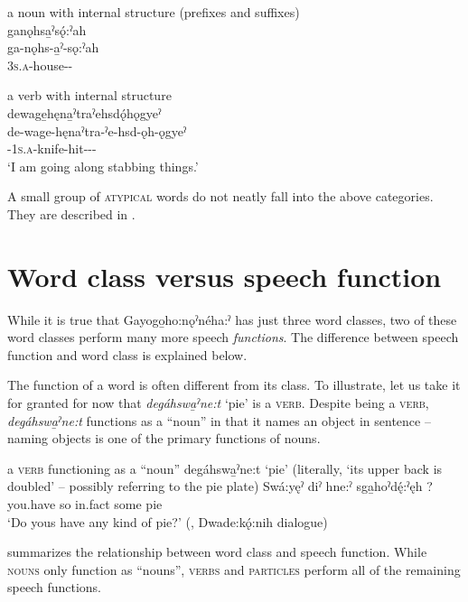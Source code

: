 \ea\label{ex:nstr} a noun with internal structure (prefixes and suffixes)\\
ganǫhsa̱ˀsǫ́:ˀah\\
\gll ga-nǫhs-a̱ˀ-sǫ:ˀah\\
 \textsc{3s.a}-house-{\nounstemformer}-{\pluralizer}\\
\glt {}
\z


\ea\label{ex:vstr} a verb with internal structure\\
dewage̱hęna̱ˀtraˀehsdǫ́hǫgyeˀ\\
\gll de-wage-hęnaˀtra-ˀe-hsd-ǫh-ǫgyeˀ\\
 {\dualic}-\textsc{1s.a}-knife-hit-{\causative}-{\stative}-{\progressive}\\
\glt `I am going along stabbing things.'
\z

A small group of \textsc{atypical} words do not neatly fall into the above categories. They are described in .


\section{Word class versus speech function} \label{ch:Word class versus word function}
While it is true that Gayogo̱ho:nǫˀnéha:ˀ has just three word classes, two of these word classes perform many more speech \textit{functions}. The difference between speech function and word class is explained below.


The function of a word is often different from its class. To illustrate, let us take it for granted for now that \textit{degáhswa̱ˀne:t} ‘pie’  is a \textsc{verb}. Despite being a \textsc{verb}, \textit{degáhswa̱ˀne:t} functions as a “noun” in that it names an object in sentence  -- naming objects is one of the primary functions of nouns. 


\ea\label{ex:halha} a \textsc{verb} functioning as a “noun”
\ea degáhswa̱ˀne:t ‘pie’ (literally, ‘its upper back is doubled’ -- possibly referring to the pie plate)\label{ex:halhaa}
\ex \label{ex:halhab}
\gll Swá:yęˀ diˀ hne:ˀ sga̱hoˀdę́:ˀęh ? \\
you.have so in.fact some pie\\
\glt ‘Do yous have any kind of pie?’ (\cite[294]{mithun_watewayestanih_1984}, Dwade:kǫ́:nih dialogue)
\z
\z 

 summarizes the relationship between word class and speech function. While \textsc{nouns} only function as “nouns”, \textsc{verbs} and \textsc{particles} perform all of the remaining speech functions.

